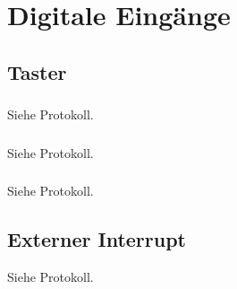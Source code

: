 \section{Digitale Eingänge}
\subsection{Taster}
\subsubsection{}
Siehe Protokoll.
\subsubsection{}
Siehe Protokoll.
\subsubsection{}
Siehe Protokoll.
\subsection{Externer Interrupt}
Siehe Protokoll.